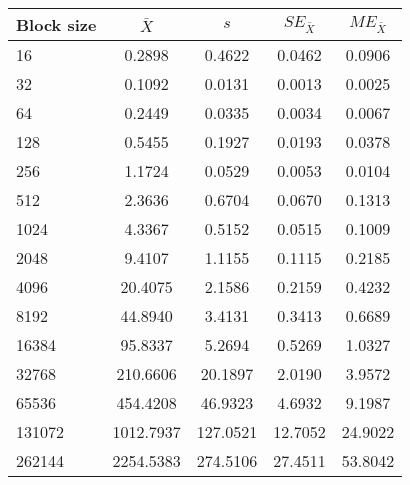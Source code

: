 \begin{tabular}{lcccc}\toprule
{\small Block size} & $\bar{X}$ & $s$ & $SE_{\bar{X}}$ & $ME_{\bar{X}}$ \\\midrule
16 & 0.2898 & 0.4622 & 0.0462 & 0.0906\\
32 & 0.1092 & 0.0131 & 0.0013 & 0.0025\\
64 & 0.2449 & 0.0335 & 0.0034 & 0.0067\\
128 & 0.5455 & 0.1927 & 0.0193 & 0.0378\\
256 & 1.1724 & 0.0529 & 0.0053 & 0.0104\\
512 & 2.3636 & 0.6704 & 0.0670 & 0.1313\\
1024 & 4.3367 & 0.5152 & 0.0515 & 0.1009\\
2048 & 9.4107 & 1.1155 & 0.1115 & 0.2185\\
4096 & 20.4075 & 2.1586 & 0.2159 & 0.4232\\
8192 & 44.8940 & 3.4131 & 0.3413 & 0.6689\\
16384 & 95.8337 & 5.2694 & 0.5269 & 1.0327\\
32768 & 210.6606 & 20.1897 & 2.0190 & 3.9572\\
65536 & 454.4208 & 46.9323 & 4.6932 & 9.1987\\
131072 & 1012.7937 & 127.0521 & 12.7052 & 24.9022\\
262144 & 2254.5383 & 274.5106 & 27.4511 & 53.8042\\
\bottomrule
\end{tabular}
